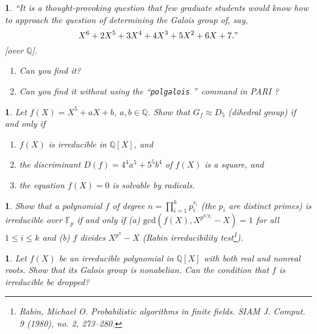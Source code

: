 \documentclass[a4paper,11pt,final,openany]{memoir}
\newtheorem{exercise}[Y]{}
\theoremstyle{nonumberplain}
\begin{document}
\begin{exercise}
\label{x19} ``It is a thought-provoking question that few graduate students
would know how to approach the question of determining the Galois group of,
say,
\[
X^{6}+2X^{5}+3X^{4}+4X^{3}+5X^{2}+6X+7.\text{\textrm{''}}%
\]
[over ${\mathbb{Q}}$].

\begin{enumerate}
\item Can you find it?

\item Can you find it without using the \textquotedblleft\texttt{polgalois}%
\textquotedblright\ command in PARI%
%
?
\end{enumerate}
\end{exercise}

\begin{exercise}
\label{x20} Let $f(X)=X^{5}+aX+b$, $a,b\in{\mathbb{Q}}$. Show that
$G_{f}\approx D_{5}$ (dihedral group) if and only if

\begin{enumerate}
\item $f(X)$ is irreducible in ${\mathbb{Q}}[X]$, and

\item the discriminant $D(f)=4^{4}a^{5}+5^{5}b^{4}$ of $f(X)$ is a square, and

\item the equation $f(X)=0$ is solvable by radicals.
\end{enumerate}
\end{exercise}

\begin{exercise}
\label{x20a} Show that a polynomial $f$ of degree $n=\prod_{i=1}^{k}%
p_{i}^{r_{i}}$ (the $p_{i}$ are distinct primes) is irreducible over
$\mathbb{F}_{p}$ if and only if (a) $\mathrm{gcd}(f(X),X^{p^{n/p_{i}}}-X)=1$
for all $1\leq i\leq k$ and (b) $f$ divides $X^{p^{n}}-X$ (Rabin
irreducibility test\footnote{Rabin, Michael O. Probabilistic algorithms in
finite fields. SIAM J. Comput. 9 (1980), no. 2, 273--280.}).
\end{exercise}

\begin{exercise}
\label{x20b}Let $f(X)$ be an irreducible polynomial in $\mathbb{Q}{}[X]$ with
both real and nonreal roots. Show that its Galois group is nonabelian. Can the
condition that $f$ is irreducible be dropped?
\end{exercise}
\end{document}
